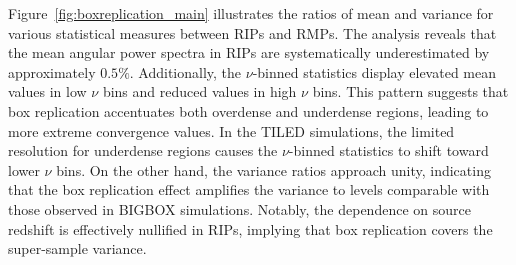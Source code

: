 Figure~\ref{fig:boxreplication_main} illustrates the ratios of mean and variance for various statistical measures between RIPs and RMPs. The analysis reveals that the mean angular power spectra in RIPs are systematically underestimated by approximately $0.5\%$. Additionally, the $\nu$-binned statistics display elevated mean values in low $\nu$ bins and reduced values in high $\nu$ bins. This pattern suggests that box replication accentuates both overdense and underdense regions, leading to more extreme convergence values. In the TILED simulations, the limited resolution for underdense regions causes the $\nu$-binned statistics to shift toward lower $\nu$ bins. On the other hand, the variance ratios approach unity, indicating that the box replication effect amplifies the variance to levels comparable with those observed in BIGBOX simulations. Notably, the dependence on source redshift is effectively nullified in RIPs, implying that box replication covers the super-sample variance. 

